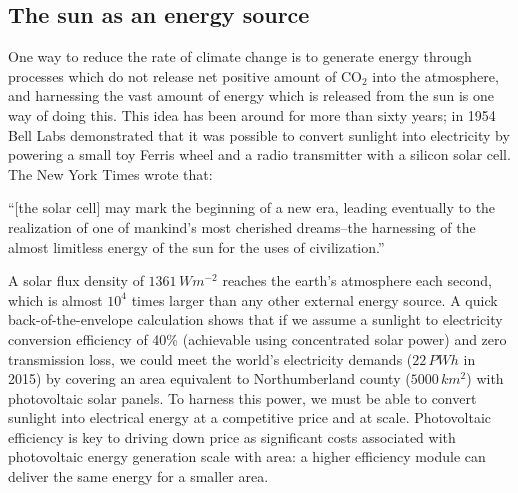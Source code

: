 \subsection{The sun as an energy source}
One way to reduce the rate of climate change is to generate energy through processes which do not release net positive amount of CO$_2$ into the atmosphere, and harnessing the vast amount of energy which is released from the sun is one way of doing this. This idea has been around for more than sixty years; in 1954 Bell Labs demonstrated that it was possible to convert sunlight into electricity by powering a small toy Ferris wheel and a radio transmitter with a silicon solar cell. The New York Times wrote that:
\begin{displayquote}
“[the solar cell] may mark the beginning of a new era, leading eventually to the realization of one of mankind’s most cherished dreams–the harnessing of the almost limitless energy of the sun for the uses of civilization.”
\end{displayquote}
A solar flux density of $1361\,Wm^{-2}$ reaches the earth's atmosphere each second, which is almost $10^4$ times larger than any other external energy source.\autocite{Kopp2011} A quick back-of-the-envelope calculation shows that if we assume a sunlight to electricity conversion efficiency of 40\% (achievable using concentrated solar power) and zero transmission loss, we could meet the world's electricity demands ($22\,PWh$ in 2015\autocite{IEA2017}) by covering an area equivalent to Northumberland county ($5000\,km^2$) with photovoltaic solar panels.
%
To harness this power, we must be able to convert sunlight into electrical energy at a competitive price and at scale. Photovoltaic efficiency is key to driving down price as significant costs associated with photovoltaic energy generation scale with area:\autocite{Fraunhofer2015,Green2016} a higher efficiency module can deliver the same energy for a smaller area.

